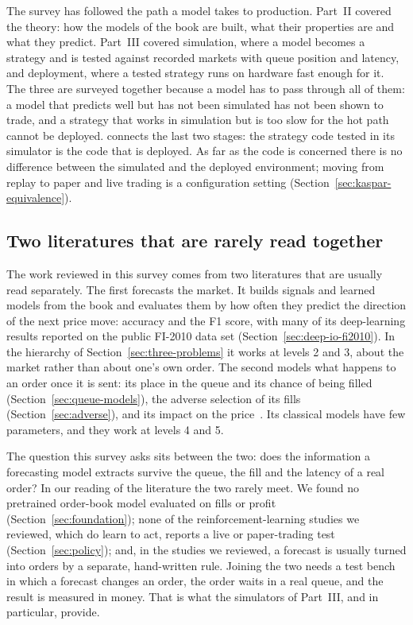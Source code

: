 The survey has followed the path a model takes to production. Part~II covered the theory: how the models of the book
are built, what their properties are and what they predict. Part~III covered simulation, where a model becomes a
strategy and is tested against recorded markets with queue position and latency, and deployment, where a tested
strategy runs on hardware fast enough for it. The three are surveyed together because a model has to pass through all
of them: a model that predicts well but has not been simulated has not been shown to trade, and a strategy that works
in simulation but is too slow for the hot path cannot be deployed. \kasparhft{} connects the last two stages: the
strategy code tested in its simulator is the code that is deployed. As far as the code is concerned there is no
difference between the simulated and the deployed environment; moving from replay to paper and live trading is a
configuration setting (Section~\ref{sec:kaspar-equivalence}).

\subsection{Two literatures that are rarely read together}
\label{sec:two-literatures}

The work reviewed in this survey comes from two literatures that are usually read separately. The first forecasts the
market. It builds signals and learned models from the book and evaluates them by how often they predict the direction
of the next price move: accuracy and the F1 score, with many of its deep-learning results reported on the public FI-2010 data set (Section~\ref{sec:deep-io-fi2010}). In the hierarchy of Section~\ref{sec:three-problems} it works at levels 2
and 3, about the market rather than about one's own order. The second models what happens to an order once it is
sent: its place in the queue and its chance of being filled (Section~\ref{sec:queue-models}), the adverse selection of
its fills (Section~\ref{sec:adverse}), and its impact on the price~\citep{kyle1985,almgren2001}. Its classical models
have few parameters, and they work at levels 4 and 5.

The question this survey asks sits between the two: does the information a forecasting model extracts survive the
queue, the fill and the latency of a real order? In our reading of the literature the two rarely meet. We found no
pretrained order-book model evaluated on fills or profit (Section~\ref{sec:foundation}); none of the reinforcement-learning
studies we reviewed, which do learn to act, reports a live or paper-trading test (Section~\ref{sec:policy}); and, in the studies we
reviewed, a forecast is usually turned into orders by a separate, hand-written rule. Joining the two needs a test bench in which a
forecast changes an order, the order waits in a real queue, and the result is measured in money. That is what the
simulators of Part~III, and \kasparhft{} in particular, provide.

